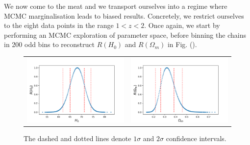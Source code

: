\documentclass[aps,prl,10pt,twocolumn,superscriptaddress, nofootinbib]{revtex4}
\begin{document}
We now come to the meat and we transport ourselves into a regime where MCMC marginalisation leads to biased results. Concretely, we restrict ourselves to the eight data points in the range $1 < z < 2$. Once again, we start by performing an MCMC exploration of parameter space, before binning the chains in 200 odd bins to reconstruct $R(H_0)$ and $R(\Omega_m)$ in Fig. (). 

\begin{figure}[htb]
   \centering
   \begin{tabular}{cc}
\includegraphics[width=80mm] {pressureless_matter/H0_R_zmin0.png} & \includegraphics[width=80mm] {pressureless_matter/om_R_zmin0.png}
\end{tabular}
\caption{The dashed and dotted lines denote $1 \sigma$ and $2 \sigma$ confidence intervals.}
\label{fig:R_zmin0}
\end{figure}
\end{document}
